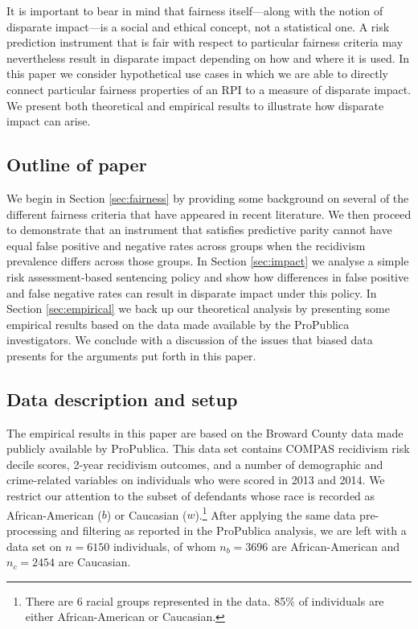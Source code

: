 \documentclass[11pt, svgnames]{article}
\numberwithin{equation}{section}
\theoremstyle{plain}
\theoremstyle{definition}
\numberwithin{prop}{section}
\numberwithin{corollary}{section}
\begin{document}
It is important to bear in mind that fairness itself---along with the notion of disparate impact---is a social and ethical concept, not a statistical one.  A risk prediction instrument that is fair with respect to particular fairness criteria may nevertheless result in disparate impact depending on how and where it is used.  In this paper we consider hypothetical use cases in which we are able to directly connect particular fairness properties of an RPI to a measure of disparate impact.  We present both theoretical and empirical results to illustrate how disparate impact can arise.

\subsection{Outline of paper}

We begin in Section \ref{sec:fairness} by providing some background on several of the different fairness criteria that have appeared in recent literature.  We then proceed to demonstrate that an instrument that satisfies predictive parity cannot have equal false positive and negative rates across groups when the recidivism prevalence differs across those groups.  In Section \ref{sec:impact} we analyse a simple risk assessment-based sentencing policy and show how differences in false positive and false negative rates can result in disparate impact under this policy.  In Section \ref{sec:empirical} we back up our theoretical analysis by presenting some empirical results based on the data made available by the ProPublica investigators.  We conclude with a discussion of the issues that biased data presents for the arguments put forth in this paper.

\subsection{Data description and setup} \label{sec:intro_outline}

The empirical results in this paper are based on the Broward County data made publicly available by ProPublica\cite{propublica2016data}.  This data set contains COMPAS recidivism risk decile scores, 2-year recidivism outcomes, and a number of demographic and crime-related variables on individuals who were scored in 2013 and 2014.    We restrict our attention to the subset of defendants whose race is recorded as African-American ($b$) or Caucasian ($w$).\footnote{There are 6 racial groups represented in the data.  85\% of individuals are either African-American or Caucasian.}  After applying the same data pre-processing and filtering as reported in the ProPublica analysis, we are left with a data set on $n = 6150$ individuals, of whom $n_b = 3696$ are African-American and $n_c = 2454$ are Caucasian.
\end{document}
